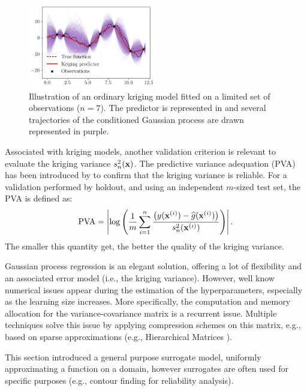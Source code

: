 \begin{figure}[ht]
    \centering
    \includegraphics[width=0.5\textwidth]{../numerical_experiments/chapter1/figures/kriging_1D.png}
    \caption{Illustration of an ordinary kriging model fitted on a limited set of observations ($n=7$). 
    The predictor is represented in and several trajectories of the conditioned Gaussian process are drawn represented in purple.}
    \label{fig:kriging_1D}
\end{figure}


Associated with kriging models, another validation criterion is relevant to evaluate the kriging variance $s_n^2({\bf x})$. 
The predictive variance adequation (PVA) has been introduced by \citet{bachoc_2013} to confirm that the kriging variance is reliable. 
For a validation performed by holdout, and using an independent $m$-sized test set, the PVA is defined as: 
\begin{equation}
    \mathrm{PVA} = \left| \log\left( \frac1m \sum_{i=1}^{n} \frac{\left(y({\bf x}^{(i)}) - \widehat{g}({\bf x}^{(i)})\right)}{s_n^2({\bf x}^{(i)})}\right) \right|.
\end{equation}
The smaller this quantity get, the better the quality of the kriging variance. 

Gaussian process regression is an elegant solution, offering a lot of flexibility and an associated error model (i.e., the kriging variance). 
However, well know numerical issues appear during the estimation of the hyperparameters, especially as the learning size increases. 
More specifically, the computation and memory allocation for the variance-covariance matrix is a recurrent issue. 
Multiple techniques solve this issue by applying compression schemes on this matrix, e.g., based on sparse approximations (e.g., Hierarchical Matrices \citealt{geoga_2020_hmat_gp}). 

This section introduced a general purpose surrogate model, uniformly approximating a function on a domain, however surrogates are often used for specific purposes (e.g., contour finding for reliability analysis). 


